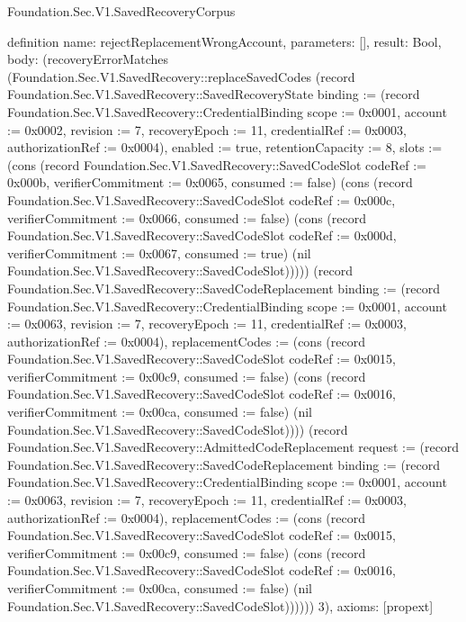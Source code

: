 \begin{lexlean}{Foundation.Sec.V1.SavedRecoveryCorpus}
\begin{semanticmodule}
definition{
  name: rejectReplacementWrongAccount,
  parameters: [],
  result: Bool,
  body: (recoveryErrorMatches (Foundation.Sec.V1.SavedRecovery::replaceSavedCodes (record Foundation.Sec.V1.SavedRecovery::SavedRecoveryState {binding := (record Foundation.Sec.V1.SavedRecovery::CredentialBinding {scope := 0x0001, account := 0x0002, revision := 7, recoveryEpoch := 11, credentialRef := 0x0003, authorizationRef := 0x0004}), enabled := true, retentionCapacity := 8, slots := (cons (record Foundation.Sec.V1.SavedRecovery::SavedCodeSlot {codeRef := 0x000b, verifierCommitment := 0x0065, consumed := false}) (cons (record Foundation.Sec.V1.SavedRecovery::SavedCodeSlot {codeRef := 0x000c, verifierCommitment := 0x0066, consumed := false}) (cons (record Foundation.Sec.V1.SavedRecovery::SavedCodeSlot {codeRef := 0x000d, verifierCommitment := 0x0067, consumed := true}) (nil Foundation.Sec.V1.SavedRecovery::SavedCodeSlot))))}) (record Foundation.Sec.V1.SavedRecovery::SavedCodeReplacement {binding := (record Foundation.Sec.V1.SavedRecovery::CredentialBinding {scope := 0x0001, account := 0x0063, revision := 7, recoveryEpoch := 11, credentialRef := 0x0003, authorizationRef := 0x0004}), replacementCodes := (cons (record Foundation.Sec.V1.SavedRecovery::SavedCodeSlot {codeRef := 0x0015, verifierCommitment := 0x00c9, consumed := false}) (cons (record Foundation.Sec.V1.SavedRecovery::SavedCodeSlot {codeRef := 0x0016, verifierCommitment := 0x00ca, consumed := false}) (nil Foundation.Sec.V1.SavedRecovery::SavedCodeSlot)))}) (record Foundation.Sec.V1.SavedRecovery::AdmittedCodeReplacement {request := (record Foundation.Sec.V1.SavedRecovery::SavedCodeReplacement {binding := (record Foundation.Sec.V1.SavedRecovery::CredentialBinding {scope := 0x0001, account := 0x0063, revision := 7, recoveryEpoch := 11, credentialRef := 0x0003, authorizationRef := 0x0004}), replacementCodes := (cons (record Foundation.Sec.V1.SavedRecovery::SavedCodeSlot {codeRef := 0x0015, verifierCommitment := 0x00c9, consumed := false}) (cons (record Foundation.Sec.V1.SavedRecovery::SavedCodeSlot {codeRef := 0x0016, verifierCommitment := 0x00ca, consumed := false}) (nil Foundation.Sec.V1.SavedRecovery::SavedCodeSlot)))})})) 3),
  axioms: [propext]
}


\end{semanticmodule}
\end{lexlean}
